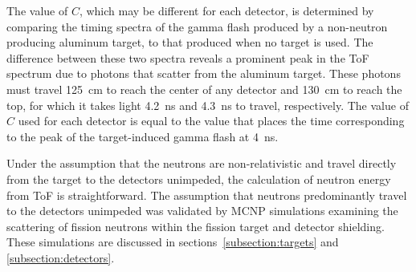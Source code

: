 The value of $C$, which may be different for each detector, is determined by comparing the timing spectra of the gamma flash produced by a non-neutron producing aluminum target, to that produced when no target is used.
The difference between these two spectra reveals a prominent peak in the ToF spectrum due to photons that scatter from the aluminum target.
These photons must travel 125~cm to reach the center of any detector and 130~cm to reach the top, for which it takes light 4.2~ns and 4.3~ns to travel, respectively.
The value of $C$ used for each detector is equal to the value that places the time corresponding to the peak of the target-induced gamma flash at 4~ns.

Under the assumption that the neutrons are non-relativistic and travel directly from the target to the detectors unimpeded, the calculation of neutron energy from ToF is straightforward.
The assumption that neutrons predominantly travel to the detectors unimpeded was validated by MCNP simulations examining the scattering of fission neutrons within the fission target and detector shielding. These simulations are discussed in sections~\ref{subsection:targets} and \ref{subsection:detectors}.

